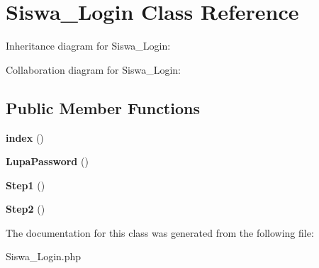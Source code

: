\hypertarget{class_siswa___login}{}\section{Siswa\+\_\+\+Login Class Reference}
\label{class_siswa___login}


Inheritance diagram for Siswa\+\_\+\+Login\+:


Collaboration diagram for Siswa\+\_\+\+Login\+:
\subsection*{Public Member Functions}
\begin{DoxyCompactItemize}
\item 
\mbox{\label{class_siswa___login_a149eb92716c1084a935e04a8d95f7347}} 
{\bfseries index} ()
\item 
\mbox{\label{class_siswa___login_a7c08c737a211b8d250eb402b2a99eaef}} 
{\bfseries Lupa\+Password} ()
\item 
\mbox{\label{class_siswa___login_a24ba292bab06076099f6badab9ddeada}} 
{\bfseries Step1} ()
\item 
\mbox{\label{class_siswa___login_af6ce22b35c5d56c138dca82e0fe3d52a}} 
{\bfseries Step2} ()
\end{DoxyCompactItemize}


The documentation for this class was generated from the following file\+:\begin{DoxyCompactItemize}
\item 
Siswa\+\_\+\+Login.\+php\end{DoxyCompactItemize}
